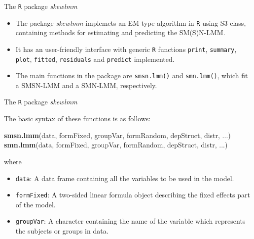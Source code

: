\documentclass[
  ignorenonframetext,
]{beamer}
\newenvironment{Shaded}{\begin{snugshade}}{\end{snugshade}}
\newcommand{\KeywordTok}[1]{\textcolor[rgb]{0.13,0.29,0.53}{\textbf{#1}}}
\newcommand{\NormalTok}[1]{#1}
\begin{document}
\begin{frame}[fragile]{The \texttt{R} package \emph{skewlmm}}
\protect\hypertarget{the-package}{}

\begin{itemize}
\item
  The package \emph{skewlmm} implemets an EM-type algorithm in
  \texttt{R} using S3 class, containing methods for estimating and
  predicting the SM(S)N-LMM.
\item
  It has an user-friendly interface with generic \texttt{R} functions
  \texttt{print}, \texttt{summary}, \texttt{plot}, \texttt{fitted},
  \texttt{residuals} and \texttt{predict} implemented.
\item
  The main functions in the package are \texttt{smsn.lmm()} and
  \texttt{smn.lmm()}, which fit a SMSN-LMM and a SMN-LMM, respectively.
\end{itemize}

\end{frame}

\begin{frame}[fragile]{The \texttt{R} package \emph{skewlmm}}
\protect\hypertarget{the-package-1}{}

The basic syntax of these functions is as follows:

\begin{Shaded}
\begin{Highlighting}[]
\KeywordTok{smsn.lmm}\NormalTok{(data, formFixed, groupVar, formRandom, }
\NormalTok{         depStruct, distr, ...)}
\KeywordTok{smn.lmm}\NormalTok{(data, formFixed, groupVar, formRandom, }
\NormalTok{        depStruct, distr, ...)}
\end{Highlighting}
\end{Shaded}

where

\begin{itemize}
\item
  \texttt{data}: A data frame containing all the variables to be used in
  the model.
\item
  \texttt{formFixed}: A two-sided linear formula object describing the
  fixed effects part of the model.
\item
  \texttt{groupVar}: A character containing the name of the variable
  which represents the subjects or groups in data.
\end{itemize}

\end{frame}
\end{document}
